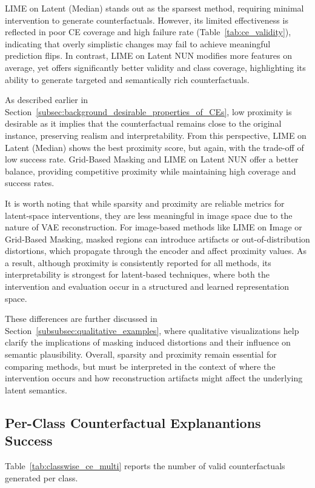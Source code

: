 LIME on Latent (Median) stands out as the sparsest method, requiring minimal intervention to generate counterfactuals. However, its limited effectiveness is reflected in poor CE coverage and high failure rate (Table~\ref{tab:ce_validity}), indicating that overly simplistic changes may fail to achieve meaningful prediction flips. In contrast, LIME on Latent NUN modifies more features on average, yet offers significantly better validity and class coverage, highlighting its ability to generate targeted and semantically rich counterfactuals.

As described earlier in Section~\ref{subsec:background_desirable_properties_of_CEs}, low proximity is desirable as it implies that the counterfactual remains close to the original instance, preserving realism and interpretability. From this perspective, LIME on Latent (Median) shows the best proximity score, but again, with the trade-off of low success rate. Grid-Based Masking and LIME on Latent NUN offer a better balance, providing competitive proximity while maintaining high coverage and success rates.

It is worth noting that while sparsity and proximity are reliable metrics for latent-space interventions, they are less meaningful in image space due to the nature of VAE reconstruction. For image-based methods like LIME on Image or Grid-Based Masking, masked regions can introduce artifacts or out-of-distribution distortions, which propagate through the encoder and affect proximity values. As a result, although proximity is consistently reported for all methods, its interpretability is strongest for latent-based techniques, where both the intervention and evaluation occur in a structured and learned representation space.

These differences are further discussed in Section~\ref{subsubsec:qualitative_examples}, where qualitative visualizations help clarify the implications of masking induced distortions and their influence on semantic plausibility. Overall, sparsity and proximity remain essential for comparing methods, but must be interpreted in the context of where the intervention occurs and how reconstruction artifacts might affect the underlying latent semantics.


\subsection{Per-Class Counterfactual Explanantions Success}
Table~\ref{tab:classwise_ce_multi} reports the number of valid counterfactuals generated per class.

